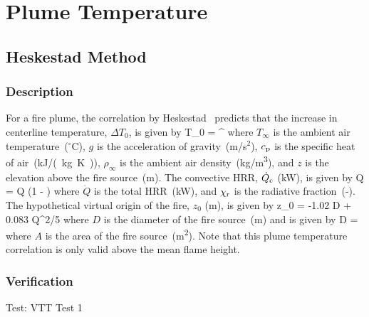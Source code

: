 
\chapter{Plume Temperature}
\label{Plume_Chapter}

\section{Heskestad Method}

\subsection*{Description}

For a fire plume, the correlation by Heskestad~\cite{SFPE:Heskestad} predicts that the increase in centerline temperature, $\Delta T_0$, is given by
\be
\Delta T_0 =  \quad ^
\label{eq:Heskestad}
\ee
where $T_\infty$ is the ambient air temperature~($^\circ$C), $g$ is the acceleration of gravity~(m/s$^2$), $c\sb{p}$ is the specific heat of air~(\si{kJ/(kg.K)}), $\rho_{\infty}$ is the ambient air density~(\si{kg/m^3}), and $z$ is the elevation above the fire source~(\si{m}). The convective HRR, $\dot Q\sb{c}$ (\si{kW}), is given by
\be
\dot Q = \dot Q (1 - \chi{})
\label{eq:Heskestad_Qc}
\ee
where $\dot Q$ is the total HRR~(\si{kW}), and $\chi\sb{r}$ is the radiative fraction~(-). The hypothetical virtual origin of the fire, $z_0$ (\si{m}), is given by
\be
z_0 = -1.02 D + 0.083 \dot Q^{2/5}
\label{eq:Heskestad_z0}
\ee
where $D$ is the diameter of the fire source~(\si{m}) and is given by
\be
D = 
\label{eq:Heskestad_D}
\ee
where $A$ is the area of the fire source~(\si{m^2}).
Note that this plume temperature correlation is only valid above the mean flame height.


\clearpage


\subsection*{Verification}

Test: VTT Test 1


